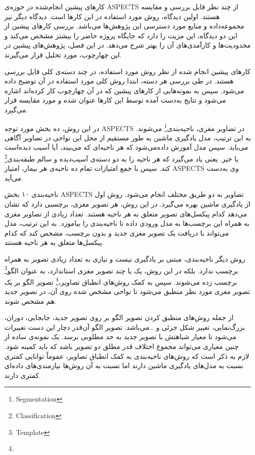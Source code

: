 

 کار‌های پیشین انجام‌شده در حوزه‌ی ASPECTS از چند نظر قابل بررسی و مقایسه هستند.
اولین دیدگاه، روش مورد استفاده در این کارها است.
دیدگاه دیگر نیز مجموعه‌داده و منابع مورد دسترسی این پژوهش‌ها می‌باشد.
بررسی کار‌های پیشین از این دو دیدگاه، این مزیت را دارد 
که جایگاه پروژه حاضر را بیشتر مشخص می‌کند و محدودیت‌ها و کارآمدی‌های آن را 
بهتر شرح می‌دهد.
در این فصل، پژوهش‌های پیشین در این چهارچوب، مورد تحلیل قرار می‌گیرند.

کارهای پیشین انجام شده از نظر روش مورد استفاده، در چند دسته‌ی کلی قابل بررسی هستند.
در طی بررسی هر دسته، ابتدا روش کلی مورد استفاده در آن توضیح داده می‌شود. 
سپس به نمونه‌هایی از کارهای پیشین که در آن چهارچوب کار کرده‌اند اشاره می‌شود
و نتایج به‌دست آمده توسط این کار‌ها عنوان شده و مورد مقایسه قرار می‌گیرد.

در این روش، ده بخش مورد توجه ASPECTS در تصاویر مغزی، 
ناحیه‌بندی\footnote{Segmentation}
 می‌شوند.
به این ترتیب،  
مدل یادگیری ماشین به طور مستقیم از محل این نواحی در تصاویر آگاهی می‌یابد.
سپس مدل آموزش داده‌می‌شود که هر ناحیه‌ای که می‌بیند، آیا آسیب دیده‌است یا خیر.
یعنی یاد می‌گیرد که هر ناحیه را به دو دسته‌ی آسیب‌دیده و سالم 
طبقه‌بندی\footnote{Classification}
کند.
سپس با جمع امتیازات تمام ده ناحیه‌ی هر بیمار، امتیاز ASPECTS وی به‌دست می‌آید.


ناحیه‌بندی ۱۰ بخش ASPECTS تصاویر به دو طریق مختلف انجام می‌شود.
روش اول از یادگیری ماشین بهره می‌گیرد.
در این روش، هر تصویر مغزی، برچسبی دارد که نشان می‌دهد کدام پیکسل‌های تصویر متعلق به هر ناحیه هستند.
تعداد زیادی از تصاویر مغزی به همراه این برچسب‌ها به مدل ورودی داده تا ناحیه‌بندی را بیاموزد.
به این ترتیب، مدل می‌تواند با دریافت یک تصویر مغزی جدید و بدون برچسب، مشخص کند که کدام پیکسل‌ها متعلق به هر ناحیه هستند.

روش دیگر ناحیه‌بندی، مبتنی بر یادگیری نیست و نیازی به تعداد زیادی تصویر به همراه برچسب ندارد.
بلکه در این روش، یک یا چند تصویر مغزی استاندارد، به عنوان 
الگو\footnote{Template}
برچسب زده می‌شوند.
سپس به کمک روش‌های 
انطباق تصاویر،\footnote{}
تصویر الگو بر یک تصویر مغزی مورد نظر منطبق می‌شود تا نواحی مشخص شده روی آن، در تصویر جدید هم مشخص شوند.

از جمله روش‌های منطبق کردن تصویر الگو بر روی تصویر جدید، جابجایی، دوران، بزرگ‌نمایی، تغییر شکل جزئی و \dots می‌باشد.
تصویر الگو آن‌قدر دچار این دست تغییرات می‌شود تا معیار شباهتش با تصویر جدید به حد مطلوبی برسد.
یک نمونه‌ی ساده از چنین معیاری می‌تواند مجموع اختلاف قدر مطلق دو تصویر باشد که باید کمینه شود.
لازم به ذکر است که روش‌های ناحیه‌بندی به کمک انطباق تصاویر، عموماً توانایی کمتری نسبت به مدل‌های 
یادگیری ماشین دارند اما نسبت به آن روش‌ها نیازمندی‌های داده‌ای کمتری دارند.

